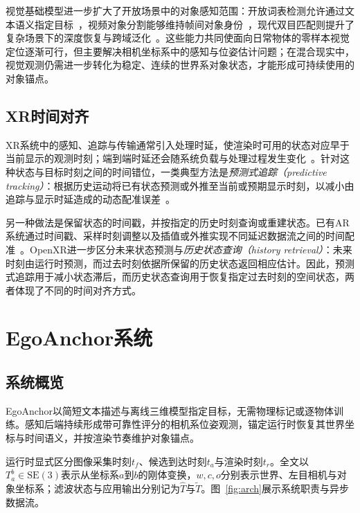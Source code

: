 \documentclass[review]{vgtc}
\begin{document}
视觉基础模型进一步扩大了开放场景中的对象感知范围：开放词表检测允许通过文本语义指定目标~\cite{owlvit2022,glip2022,groundingdino2025,yoloe2025}，视频对象分割能够维持帧间对象身份~\cite{xmem2022,cutie2024}，现代双目匹配则提升了复杂场景下的深度恢复与跨域泛化~\cite{raftstereo2021,igevstereo2023,fastfoundationstereo2026}。这些能力共同使面向日常物体的零样本视觉定位逐渐可行，但主要解决相机坐标系中的感知与位姿估计问题；在混合现实中，视觉观测仍需进一步转化为稳定、连续的世界系对象状态，才能形成可持续使用的对象锚点。

\subsection{XR时间对齐}

XR系统中的感知、追踪与传输通常引入处理时延，使渲染时可用的状态对应早于当前显示的观测时刻；端到端时延还会随系统负载与处理过程发生变化~\cite{diluca2010latency,mrloop2022,stauffert2020mtp}。针对这种状态与目标时刻之间的时间错位，一类典型方法是\emph{预测式追踪（predictive tracking）}：根据历史运动将已有状态预测或外推至当前或预期显示时刻，以减小由追踪与显示时延造成的动态配准误差~\cite{azuma1994improving,laviola2003double,pvt2023,yoon2022headmotion}。

另一种做法是保留状态的时间戳，并按指定的历史时刻查询或重建状态。已有AR系统通过时间戳、采样时刻调整以及插值或外推实现不同延迟数据流之间的时间配准~\cite{jacobs1997latency}。OpenXR进一步区分未来状态预测与\emph{历史状态查询（history retrieval）}：未来时刻由运行时预测，而过去时刻依据所保留的历史状态返回相应估计。因此，预测式追踪用于减小状态滞后，而历史状态查询用于恢复指定过去时刻的空间状态，两者体现了不同的时间对齐方式。

\section{EgoAnchor系统}\label{sec:system}

\subsection{系统概览}

EgoAnchor以简短文本描述与离线三维模型指定目标，无需物理标记或逐物体训练。感知后端持续形成带可靠性评分的相机系位姿观测，锚定运行时恢复其世界坐标与时间语义，并按渲染节奏维护对象锚点。

运行时显式区分图像采集时刻$t_f$、候选到达时刻$t_a$与渲染时刻$t_r$。全文以$T_a^b\in\mathrm{SE}(3)$表示从坐标系$a$到$b$的刚体变换，$w,c,o$分别表示世界、左目相机与对象坐标系；滤波状态与应用输出分别记为$\widehat{T}$与$\widetilde{T}$。图~\ref{fig:arch}展示系统职责与异步数据流。
\end{document}
